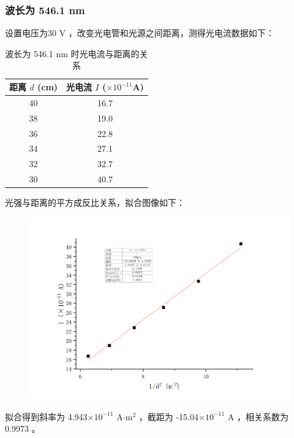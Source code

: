 \documentclass[a4paper]{extarticle}
\begin{document}
    \subsubsection{波长为 546.1 nm}
    设置电压为30 V ，改变光电管和光源之间距离，测得光电流数据如下：
    \begin{table}[H]
        \centering
        \caption{波长为 546.1 nm 时光电流与距离的关系}
        \begin{tabular}{cc}
            \toprule
            距离 $d$ (cm) & 光电流 $I$ ($\times10^{-11}$A)\\
            \midrule
            40 & 16.7\\
            38 & 19.0\\
            36 & 22.8\\
            34 & 27.1\\
            32 & 32.7\\
            30 & 40.7\\
            \bottomrule
        \end{tabular}
    \end{table}
    光强与距离的平方成反比关系，拟合图像如下：
    \begin{figure}[H]
        \centering
        \includegraphics[width=0.8\linewidth]{6.png}
    \end{figure}
    拟合得到斜率为 4.943$\times10^{-11}$ A$\cdot$m$^2$ ，截距为 -15.04$\times10^{-11}$ A ，相关系数为 0.9973 。
    \newpage
\end{document}

